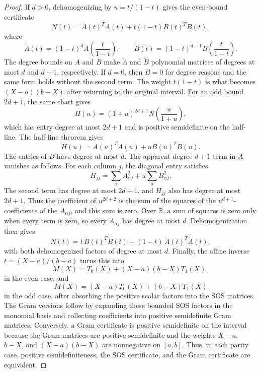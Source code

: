 \documentclass[uplatex,dvipdfmx]{jsarticle}
\theoremstyle{matrixsosdefinition}
\begin{document}
\begin{proof}
  If \(d>0\), dehomogenizing by \(u=t/(1-t)\) gives the even-bound certificate
  \[
    N(t)=\widetilde A(t)^T\widetilde A(t)
      +t(1-t)\widetilde B(t)^T\widetilde B(t),
  \]
  where
  \[
    \widetilde A(t)=(1-t)^dA\!\left(\frac{t}{1-t}\right),\qquad
    \widetilde B(t)=(1-t)^{d-1}B\!\left(\frac{t}{1-t}\right).
  \]
  The degree bounds on \(A\) and \(B\) make \(\widetilde A\) and
  \(\widetilde B\) polynomial matrices of degrees at most \(d\) and \(d-1\),
  respectively.  If \(d=0\), then \(B=0\) for degree reasons and the same form
  holds without the second term.
  The weight \(t(1-t)\) is what becomes \((X-a)(b-X)\) after returning to the
  original interval.
  For an odd bound \(2d+1\), the same chart gives
\[
  H(u)=(1+u)^{2d+1}N\!\left(\frac{u}{1+u}\right),
\]
which has entry degree at most \(2d+1\) and is positive semidefinite on the
half-line.  The half-line theorem gives
\[
  H(u)=A(u)^TA(u)+uB(u)^TB(u).
\]
  The entries of \(B\) have degree at most \(d\).  The apparent degree \(d+1\)
  term in \(A\) vanishes as follows.  For each column \(j\), the diagonal entry
  satisfies
  \[
    H_{jj}=\sum_\alpha A_{\alpha j}^2
      +u\sum_\alpha B_{\alpha j}^2.
  \]
  The second term has degree at most \(2d+1\), and \(H_{jj}\) also has degree at
  most \(2d+1\).  Thus the coefficient of \(u^{2d+2}\) is the sum of the
  squares of the \(u^{d+1}\)-coefficients of the \(A_{\alpha j}\), and this sum
  is zero.  Over \(\mathbb{R}\), a sum of squares is zero only when every term
  is zero, so every \(A_{\alpha j}\) has degree at most \(d\).
  Dehomogenization then gives
  \[
    N(t)=t\,\widetilde B(t)^T\widetilde B(t)
      +(1-t)\,\widetilde A(t)^T\widetilde A(t),
  \]
  with both dehomogenized factors of degree at most \(d\).
Finally, the affine inverse \(t=(X-a)/(b-a)\) turns this into
\[
  M(X)=T_0(X)+(X-a)(b-X)T_1(X),
\]
in the even case, and
\[
  M(X)=(X-a)T_0(X)+(b-X)T_1(X)
\]
in the odd case, after absorbing the positive scalar factors into the SOS
matrices.
The Gram versions follow by expanding these bounded SOS factors in the
monomial basis and collecting coefficients into positive semidefinite Gram
matrices.
Conversely, a Gram certificate is positive semidefinite on the
interval because the Gram matrices are positive semidefinite and the weights
\(X-a\), \(b-X\), and \((X-a)(b-X)\) are nonnegative on \([a,b]\).
Thus, in each parity case, positive semidefiniteness, the SOS certificate, and
the Gram certificate are equivalent.
\end{proof}

\appendix
\end{document}

